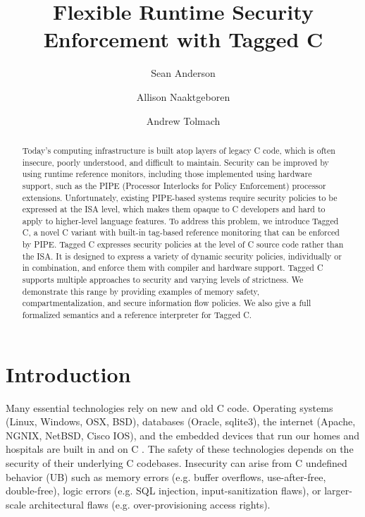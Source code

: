 \documentclass{llncs}
\title{Flexible Runtime Security Enforcement with Tagged C}
\author{Sean Anderson \and Allison Naaktgeboren \and Andrew Tolmach}
\institute{Portland State University}
\begin{document}





\maketitle

\begin{abstract}
Today's computing infrastructure is built atop layers of legacy C code, 
which is often insecure, poorly understood, and difficult to maintain.
Security can be improved by using runtime reference monitors, including those
implemented using hardware support, such as the PIPE (Processor
Interlocks for Policy Enforcement) processor extensions. Unfortunately,
existing PIPE-based systems require security policies to be expressed at the ISA level,
which makes them opaque to C developers and hard to apply to higher-level language features.
To address this problem, we introduce Tagged C, a novel C variant with
built-in tag-based reference monitoring that can be enforced by PIPE.
Tagged C expresses security policies at the level of C source code rather than the ISA.
It is designed to express a variety of dynamic security policies,  
individually or in combination, and enforce them with compiler and hardware support.
Tagged C supports multiple approaches to security and varying levels of strictness. We demonstrate
this range by providing examples of memory safety, compartmentalization,
and secure information flow policies. We also give a full formalized semantics
and a reference interpreter for Tagged C.
\end{abstract}

\section{Introduction}
Many essential technologies rely on new and old C code.
Operating systems (Linux, Windows, OSX, BSD), databases (Oracle, sqlite3), the internet
(Apache, NGNIX, NetBSD, Cisco IOS), and the 
embedded devices that run our homes and hospitals are built in and on C \cite{Munoz:PoweredbyC}. 
The safety of these technologies
depends on the security of their underlying C codebases.
Insecurity can arise from C
undefined behavior (UB) such as memory errors (e.g. buffer overflows, use-after-free, double-free),
logic errors (e.g. SQL injection, input-sanitization flaws), or
larger-scale architectural flaws (e.g. over-provisioning access rights).
\end{document}
